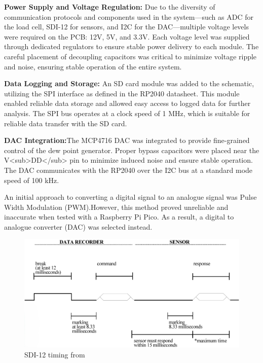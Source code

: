 \textbf{Power Supply and Voltage Regulation:} Due to the diversity of communication protocols and components used in the system—such as ADC for the load cell, SDI-12 for sensors, and I2C for the DAC—multiple voltage levels were required on the PCB: 12V, 5V, and 3.3V. Each voltage level was supplied through dedicated regulators to ensure stable power delivery to each module. The careful placement of decoupling capacitors was critical to minimize voltage ripple and noise, ensuring stable operation of the entire system.

\textbf{Data Logging and Storage:} An SD card module was added to the schematic, utilizing the SPI interface as defined in the RP2040 datasheet. This module enabled reliable data storage and allowed easy access to logged data for further analysis. The SPI bus operates at a clock speed of 1 MHz, which is suitable for reliable data transfer with the SD card.

\textbf{DAC Integration:}The MCP4716 DAC was integrated to provide fine-grained control of the dew point generator. Proper bypass capacitors were placed near the V<sub>DD</sub> pin to minimize induced noise and ensure stable operation. The DAC communicates with the RP2040 over the I2C bus at a standard mode speed of 100 kHz.

An initial approach to converting a digital signal to an analogue signal was Pulse Width Modulation (PWM).However, this method proved unreliable and inaccurate when tested with a Raspberry Pi Pico. As a result, a digital to analogue converter (DAC) was selected instead.

\begin{figure}
    \includegraphics[width=\linewidth]{figures/SDI-12_timing.png}
    \caption{SDI-12 timing from \cite{sdi12_datasheet}}
    \label{sdi12_timing}
\end{figure}

